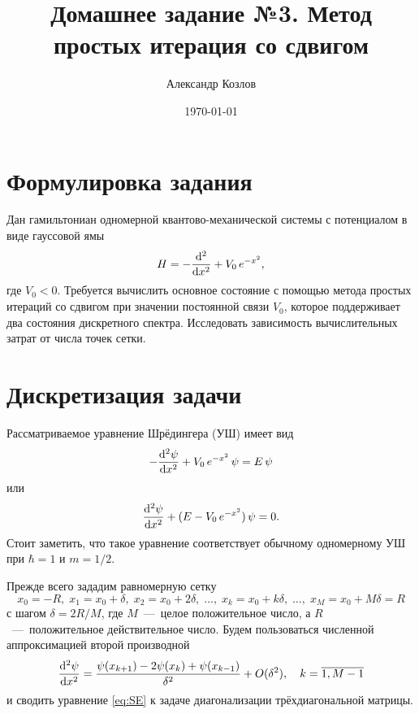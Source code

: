 \documentclass[10pt]{article}
\title{Домашнее задание №3. Метод простых итерация со сдвигом}
\author{Александр Козлов}
\date{\today}
\begin{document}
\maketitle

\section*{Формулировка задания}

Дан гамильтониан одномерной квантово-механической системы с потенциалом в виде гауссовой ямы
\begin{equation}
    H = - \dv[2]{}{x} + V_0\, e^{-x^2},
\end{equation}
где $V_0 < 0$. Требуется вычислить основное состояние с помощью метода простых итераций со сдвигом при значении постоянной связи $V_0$, которое поддерживает два состояния дискретного спектра. Исследовать зависимость вычислительных затрат от числа точек сетки.

\section{Дискретизация задачи}

Рассматриваемое уравнение Шрёдингера (УШ) имеет вид
\begin{equation}
    -\dv[2]{\psi}{x} + V_0\, e^{-x^2}\, \psi  = E\, \psi
    \label{eq:SE}
\end{equation}
или
\begin{equation}
    \dv[2]{\psi}{x}  + (E - V_0\, e^{-x^2})\, \psi  = 0.
\end{equation}
Стоит заметить, что такое уравнение соответствует обычному одномерному УШ при $\hbar=1$ и $m=1/2$.

Прежде всего зададим равномерную сетку
\begin{equation}
    x_0 = -R,\; x_1 = x_0 + \delta,\; x_2 = x_0 + 2\delta,\; \ldots,\; x_k = x_0 + k\delta,\; \ldots,\; x_M = x_0 + M \delta = R
\end{equation}
с шагом $\delta = 2R/M$, где $M$~---~целое положительное число, а $R$~---~положительное действительное число. Будем пользоваться численной аппроксимацией второй производной
\begin{equation}
    \dv[2]{\psi}{x}(x_k) = \dfrac{\psi(x_{k+1}) - 2\psi(x_{k}) + \psi(x_{k-1})}{\delta^2} + O(\delta^2),\quad k = \overline{1,M-1}
\end{equation}
и сводить уравнение \eqref{eq:SE} к задаче диагонализации трёхдиагональной матрицы.
\end{document}
